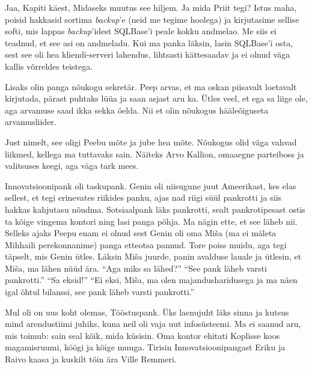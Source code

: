 
Jaa, Kapiti käest, Midaseks muutus see hiljem. Ja mida 
Priit tegi? Istus maha, poisid hakkasid sortima \emph{backup}'e (neid me 
tegime hoolega) ja kirjutasime sellise softi, mis lappas \emph{backup}'idest SQLBase'i 
peale kokku andmelao. Me siis ei teadnud, et see asi on andmeladu. Kui ma panka läksin, lasin SQLBase'i osta, sest see oli hea 
kliendi-serveri lahendus, lihtsasti kättesaadav ja ei olnud väga kallis võrreldes 
teistega. 

Lisaks olin panga nõukogu sekretär. Peep arvas, et ma oskan 
piisavalt loetavalt kirjutada, pärast puhtaks lüüa ja saan asjast aru 
ka. Ütles veel, et ega sa liige ole, aga arvamuse saad ikka sekka 
öelda. Nii et olin nõukogus hääleõiguseta arvamusliider.


Just nimelt, see oligi Peebu mõte ja jube hea mõte. Nõukogus 
olid väga vahvad liikmed, kellega ma tuttavaks sain. Näiteks Arvo 
Kallion, omaaegne
parteiboss ja valitsuses keegi, aga väga tark mees. 

Innovatsioonipank oli taskupank. Genin oli niisugune juut Ameerikast, kes 
elas sellest, et tegi erinevates riikides panku, ajas nad riigi süül 
pankrotti ja siis hakkas kahjutasu nõudma. 
Sotsiaalpank läks pankrotti, sealt pankrotipesast 
ostis ta kõige vingema kontori ning lasi panga põhja. Ma nägin ette, et see läheb nii. Selleks ajaks Peepu enam ei olnud 
sest Genin oli oma Miša (ma ei mäleta Mihhaili perekonnanime) panga etteotsa 
pannud. Tore poiss muidu, aga tegi täpselt, mis Genin ütles. Läksin Miša juurde, 
panin avalduse lauale ja ütlesin, et Miša, ma lähen nüüd ära. 
\enquote{Aga miks sa lähed?}  \enquote{See pank läheb varsti pankrotti.} 
\enquote{Sa eksid!}  \enquote{Ei eksi, Miša, ma olen majandusharidusega ja ma 
näen igal õhtul bilanssi, see pank läheb varsti pankrotti.} 

Mul oli on uus koht olemas, Tööstuspank. Üks 
laenujuht läks sinna ja kutsus mind arendustiimi juhiks, kuna neil oli vaja uut 
infosüsteemi. Ma ei saanud aru, mis toimub: sain seal kõik, mida küsisin. Oma kontor ehitati Koplisse koos magamisruumi, köögi ja kõige muuga. Tirisin Innovatsioonipangast Eriku ja Raivo kaasa ja kuskilt tõin ära Ville Remmeri.


